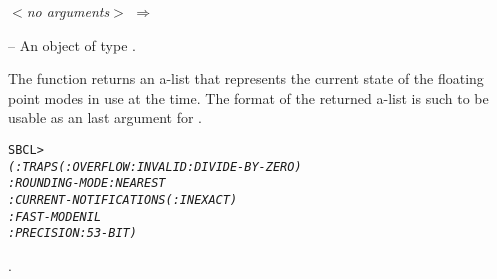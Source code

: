 \documentclass[../Floating-Point-Environment.tex]{subfiles}
\begin{document}

\DSyntax{}

 \textit{$<$no arguments$>$}
$\Rightarrow$ 

\DArgsNValues{}

 --  An object of type .


\DDescription{}

The function returns an a-list that represents the current state of
the floating point modes in use at the time.  The format of the
returned  a-list is such to be
usable as an  last argument for
.


\DExamples{}

\begin{alltt}
SBCL> 
\textit{(:TRAPS (:OVERFLOW :INVALID :DIVIDE-BY-ZERO)
 :ROUNDING-MODE :NEAREST
 :CURRENT-NOTIFICATIONS (:INEXACT)
 :FAST-MODE NIL
 :PRECISION :53-BIT)}
\end{alltt}


\DSeeAlso{}

.
\end{document}
